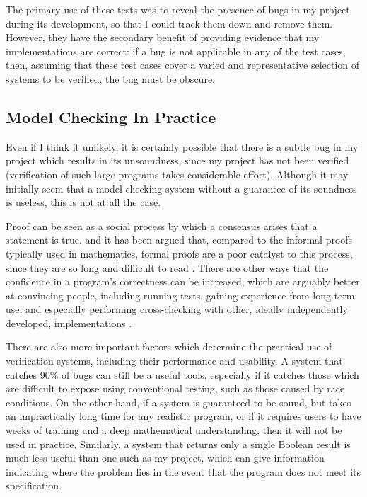 \documentclass[12pt,a4paper,twoside,openright]{report}
\begin{document}
The primary use of these tests was to
reveal the presence of bugs in my
project during its development, so
that I could track them down and
remove them. However, they have the
secondary benefit of providing
evidence that my implementations are
correct: if a bug is not applicable
in any of the test cases, then,
assuming that these test cases cover a
varied and representative selection
of systems to be verified,
the bug must be obscure.

\subsection{Model Checking In Practice}
Even if I think it unlikely, it is
certainly possible that there is a subtle
bug in my project which results in its
unsoundness, since my project has not
been verified (verification of such
large programs takes
considerable effort).
Although it may initially seem
that a model-checking system without
a guarantee of its
soundness is useless, this
is not at all the case.

Proof can be seen as a social process
by which a consensus arises that
a statement is true, and it has been
argued that, compared to the informal
proofs typically used in mathematics,
formal proofs are a
poor catalyst to this process, since
they are so long and difficult to
read \cite{demi79}. There are other
ways that the confidence in a program's
correctness can be increased, which
are arguably better at convincing people, including
running tests, gaining experience from
long-term use, and especially performing
cross-checking with other, ideally
independently developed, implementations
\cite{tau02}.

There are also more important factors
which determine the practical use of
verification systems, including their
performance and usability. A system that
catches 90\% of bugs can still be a
useful tools, especially if it catches
those which are difficult to expose
using conventional testing, such as
those caused by race conditions. On
the other hand, if a system
is guaranteed to be sound, but takes an
impractically long time for any realistic
program, or if it requires users to have
weeks of training and a deep mathematical
understanding, then it will not be used in
practice.
Similarly, a system that
returns only a single Boolean result
is much less useful than one such as my project,
which can give information indicating where
the problem lies in the event that the
program does not meet its specification.
\end{document}
